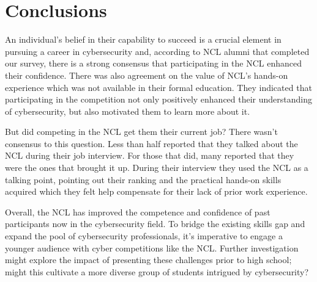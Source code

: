 \documentclass{article}
\begin{document}
\section{Conclusions}

An individual's belief in their capability to succeed is a crucial element in pursuing a career in cybersecurity and, according to NCL alumni that completed our survey, there is a strong consensus that participating in the NCL enhanced their confidence. There was also agreement on the value of NCL’s hands-on experience which was not available in their formal education. They indicated that participating in the competition not only positively enhanced their understanding of cybersecurity, but also motivated them to learn more about it.

But did competing in the NCL get them their current job? There wasn’t consensus to this question. Less than half reported that they talked about the NCL during their job interview. For those that did, many reported that they were the ones that brought it up. During their interview they used the NCL as a talking point, pointing out their ranking and the practical hands-on skills acquired which they felt help compensate for their lack of prior work experience.

Overall, the NCL has improved the competence and confidence of past participants now in the cybersecurity field. To bridge the existing skills gap and expand the pool of cybersecurity professionals, it's imperative to engage a younger audience with cyber competitions like the NCL. Further investigation might explore the impact of presenting these challenges prior to high school; might this cultivate a more diverse group of students intrigued by cybersecurity?

\raggedright
\printbibliography
\end{document}
